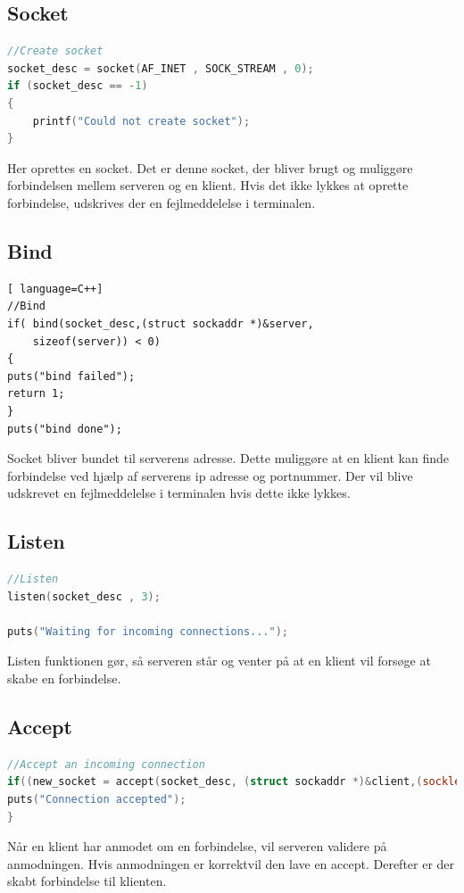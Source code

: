 \documentclass[12pt,fleqn,a4paper]{report}
\begin{document}
\subsection{Socket}
\begin{framed}
\begin{lstlisting}[language=C++]
//Create socket
socket_desc = socket(AF_INET , SOCK_STREAM , 0);
if (socket_desc == -1)
{
	printf("Could not create socket");
}
\end{lstlisting}
\end{framed}
Her oprettes en socket. Det er denne socket, der bliver brugt og muliggøre forbindelsen mellem serveren og en klient. Hvis det ikke lykkes at oprette forbindelse, udskrives der en fejlmeddelelse i terminalen. 
\newpage
\subsection{Bind}
\begin{framed}
\begin{lstlisting}[ language=C++]
//Bind
if( bind(socket_desc,(struct sockaddr *)&server,
	sizeof(server)) < 0)
{
puts("bind failed");
return 1;
}
puts("bind done");
\end{lstlisting}
\end{framed}
Socket bliver bundet til serverens adresse. Dette muliggøre at en klient kan finde forbindelse ved hjælp af serverens ip adresse og portnummer. Der vil blive udskrevet en fejlmeddelelse i terminalen hvis dette ikke lykkes.

\subsection{Listen}
\begin{framed}
\begin{lstlisting}[language=C++]
//Listen
listen(socket_desc , 3);

puts("Waiting for incoming connections...");
\end{lstlisting}
\end{framed}
Listen funktionen gør, så serveren står og venter på at en klient vil forsøge at skabe en forbindelse. 

\subsection{Accept}
\begin{framed}
\begin{lstlisting}[language=C++]
//Accept an incoming connection
if((new_socket = accept(socket_desc, (struct sockaddr *)&client,(socklen_t*)&c))){
puts("Connection accepted");
}
\end{lstlisting}
\end{framed}
Når en klient har anmodet om en forbindelse, vil serveren validere på anmodningen. Hvis anmodningen er korrektvil den lave en accept. Derefter er der skabt forbindelse til klienten. 
\newpage
\end{document}
